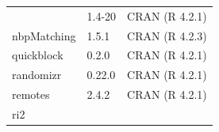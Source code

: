 \documentclass[
  12pt,
]{book}
\theoremstyle{definition}
\theoremstyle{definition}
\theoremstyle{definition}
\theoremstyle{remark}
\begin{document}
\begin{longtable}[]{@{}lll@{}}
\begin{minipage}[t]{0.14\columnwidth}
\end{minipage} & \begin{minipage}[t]{0.08\columnwidth}\raggedright
1.4-20\strut
\end{minipage} & \begin{minipage}[t]{0.69\columnwidth}\raggedright
CRAN (R 4.2.1)\strut
\end{minipage}\tabularnewline
\begin{minipage}[t]{0.14\columnwidth}\raggedright
nbpMatching\strut
\end{minipage} & \begin{minipage}[t]{0.08\columnwidth}\raggedright
1.5.1\strut
\end{minipage} & \begin{minipage}[t]{0.69\columnwidth}\raggedright
CRAN (R 4.2.3)\strut
\end{minipage}\tabularnewline
\begin{minipage}[t]{0.14\columnwidth}\raggedright
quickblock\strut
\end{minipage} & \begin{minipage}[t]{0.08\columnwidth}\raggedright
0.2.0\strut
\end{minipage} & \begin{minipage}[t]{0.69\columnwidth}\raggedright
CRAN (R 4.2.1)\strut
\end{minipage}\tabularnewline
\begin{minipage}[t]{0.14\columnwidth}\raggedright
randomizr\strut
\end{minipage} & \begin{minipage}[t]{0.08\columnwidth}\raggedright
0.22.0\strut
\end{minipage} & \begin{minipage}[t]{0.69\columnwidth}\raggedright
CRAN (R 4.2.1)\strut
\end{minipage}\tabularnewline
\begin{minipage}[t]{0.14\columnwidth}\raggedright
remotes\strut
\end{minipage} & \begin{minipage}[t]{0.08\columnwidth}\raggedright
2.4.2\strut
\end{minipage} & \begin{minipage}[t]{0.69\columnwidth}\raggedright
CRAN (R 4.2.1)\strut
\end{minipage}\tabularnewline
\begin{minipage}[t]{0.14\columnwidth}\raggedright
ri2\strut
\end{minipage} & \begin{minipage}[t]{0.08\columnwidth}\raggedright

\end{minipage}
\end{longtable}
\end{document}
